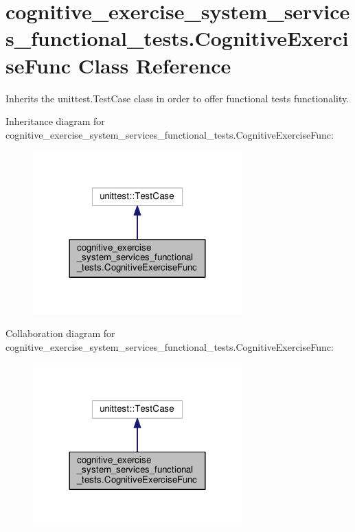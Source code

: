 \hypertarget{classcognitive__exercise__system__services__functional__tests_1_1CognitiveExerciseFunc}{\section{cognitive\-\_\-exercise\-\_\-system\-\_\-services\-\_\-functional\-\_\-tests.\-Cognitive\-Exercise\-Func Class Reference}
\label{classcognitive__exercise__system__services__functional__tests_1_1CognitiveExerciseFunc}
}


Inherits the unittest.\-Test\-Case class in order to offer functional tests functionality.  




Inheritance diagram for cognitive\-\_\-exercise\-\_\-system\-\_\-services\-\_\-functional\-\_\-tests.\-Cognitive\-Exercise\-Func\-:
\nopagebreak
\begin{figure}[H]
\begin{center}
\leavevmode
\includegraphics[width=228pt]{classcognitive__exercise__system__services__functional__tests_1_1CognitiveExerciseFunc__inherit__graph}
\end{center}
\end{figure}


Collaboration diagram for cognitive\-\_\-exercise\-\_\-system\-\_\-services\-\_\-functional\-\_\-tests.\-Cognitive\-Exercise\-Func\-:
\nopagebreak
\begin{figure}[H]
\begin{center}
\leavevmode
\includegraphics[width=228pt]{classcognitive__exercise__system__services__functional__tests_1_1CognitiveExerciseFunc__coll__graph}
\end{center}
\end{figure}
